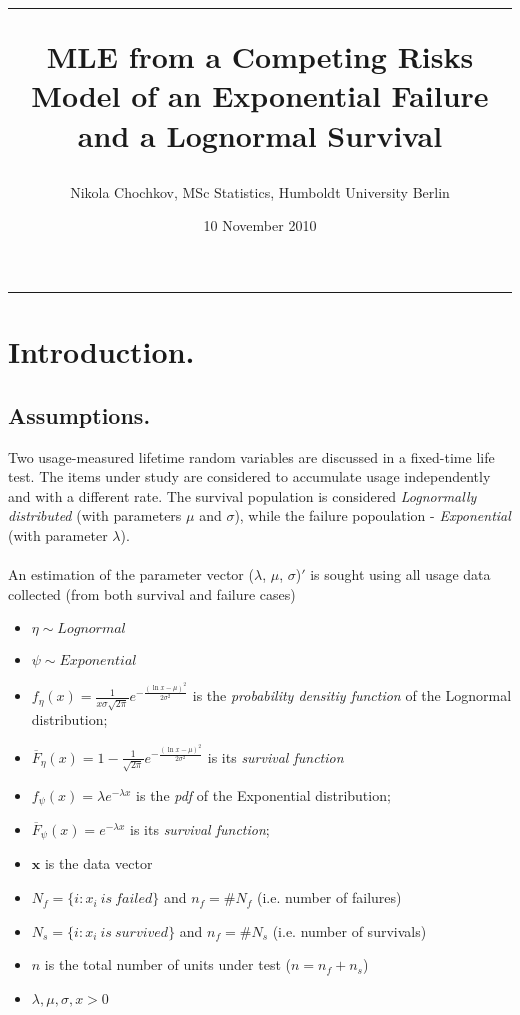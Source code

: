 \documentclass{article}
\title{\hrule \vspace{0.3cm}MLE from a Competing Risks Model of an Exponential Failure and a Lognormal Survival}
\date{10 November 2010}
\author{Nikola Chochkov, MSc Statistics, Humboldt University Berlin}
\begin{document}
\maketitle
\hrule
\section{Introduction.}
\subsection{Assumptions.}
\indent \indent Two usage-measured lifetime random variables are discussed in a fixed-time life test. The items under study are considered to accumulate usage independently and with a different rate. The survival population is considered \textit{Lognormally distributed} (with parameters $\mu$ and $\sigma$), while the failure popoulation - \textit{Exponential} (with parameter $\lambda$). 
\\ 
\\ \indent An estimation of the parameter vector ($\lambda$, $\mu$, $\sigma$)$'$ is sought using all usage data collected (from both survival and failure cases) 
\begin{itemize}
\item $\eta \sim Lognormal$ 
\item $\psi \sim Exponential$ 
\item $f_\eta(x) = \frac{1}{x \sigma \sqrt{2 \pi}} e^{-\frac{\left( \ln x - \mu \right)^2}{2\sigma^2}}$ is the \textit{probability densitiy function} of the Lognormal distribution;
\item $\overline F_\eta(x) = 1 - \frac{1}{\sqrt{2 \pi}} e^{-\frac{\left( \ln x - \mu \right)^2}{2\sigma^2}}$ is its \textit{survival function}
\item $f_\psi(x) = \lambda e^{- \lambda x}$ is the \textit{pdf} of the Exponential distribution; 
\item $\overline F_\psi(x) = e^{- \lambda x}$ is its \textit{survival function};
\item $\textbf{x}$ is the data vector 
\item $N_f = \{i : x_i\ is\ failed \}$ and $n_f  = \# N_f$ (i.e. number of failures) 
\item $N_s = \{i : x_i\ is\ survived \}$ and $n_f  = \# N_s$ (i.e. number of survivals)
\item $n$ is the total number of units under test ($n = n_f + n_s$)
\item $\lambda, \mu, \sigma, x > 0$
\end{itemize}
\end{document}
